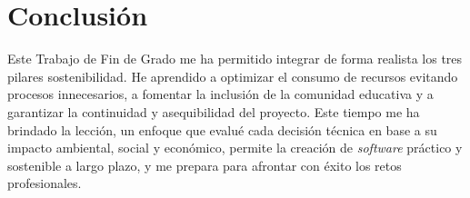 \section{Conclusión}
Este Trabajo de Fin de Grado me ha permitido integrar de forma realista los tres pilares sostenibilidad. He aprendido a optimizar el consumo de recursos evitando procesos innecesarios, a fomentar la inclusión de la comunidad educativa y a garantizar la continuidad y asequibilidad del proyecto. Este tiempo me ha brindado la lección, un enfoque que evalué cada decisión técnica en base a su impacto ambiental, social y económico, permite la creación de \textit{software} práctico y sostenible a largo plazo, y me prepara para afrontar con éxito los retos profesionales.